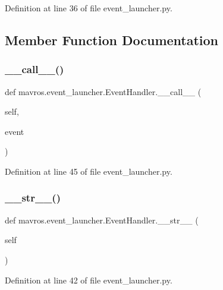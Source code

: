 Definition at line 36 of file event\+\_\+launcher.\+py.



\subsection{Member Function Documentation}
\mbox{\label{classmavros_1_1event__launcher_1_1EventHandler_a4843977767858da045211d4814530d01}} 
\subsubsection{\texorpdfstring{\_\_call\_\_()}{\_\_call\_\_()}}
{\footnotesize\ttfamily def mavros.\+event\+\_\+launcher.\+Event\+Handler.\+\_\+\+\_\+call\+\_\+\+\_\+ (\begin{DoxyParamCaption}\item[{}]{self,  }\item[{}]{event }\end{DoxyParamCaption})}



Definition at line 45 of file event\+\_\+launcher.\+py.

\mbox{\label{classmavros_1_1event__launcher_1_1EventHandler_a1b2afe8c71a0f039c10ebd68234d30e1}} 
\subsubsection{\texorpdfstring{\_\_str\_\_()}{\_\_str\_\_()}}
{\footnotesize\ttfamily def mavros.\+event\+\_\+launcher.\+Event\+Handler.\+\_\+\+\_\+str\+\_\+\+\_\+ (\begin{DoxyParamCaption}\item[{}]{self }\end{DoxyParamCaption})}



Definition at line 42 of file event\+\_\+launcher.\+py.

